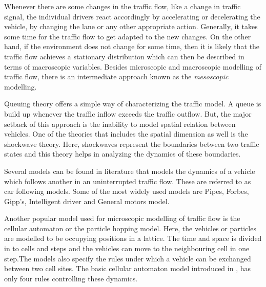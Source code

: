 \documentclass[a4paper,12pt]{scrartcl}
\begin{document}
Whenever there are some changes in the traffic flow, like a change in traffic signal, the individual drivers react accordingly by accelerating or decelerating the vehicle, by changing the lane or any other appropriate action. Generally, it takes some time for the traffic flow to get adapted to the new changes. On the other hand, if the environment does not change for some time, then it is likely that the traffic flow achieves a stationary distribution which can then be described in terms of macroscopic variables. Besides microscopic and macroscopic modelling of traffic flow, there is an intermediate approach known as the \emph{mesoscopic} modelling.


Queuing theory offers a simple way of characterizing the traffic model. 
A queue is build up whenever the traffic inflow exceeds the traffic outflow. 
But, the major setback of this approach is the inability to model spatial relation between vehicles. One of the theories that includes the spatial dimension as well is the shockwave theory.
Here, shockwaves represent the boundaries between two traffic states and this theory helps in analyzing the dynamics of these boundaries.

Several models can be found in literature that models the dynamics of a vehicle which follows another in an uninterrupted traffic flow. These are referred to as car following models\cite{chakroborty1999TRET}.
Some of the most widely used models are Pipes, Forbes, Gipp's, Intelligent driver and General motors model. 

Another popular model used for microscopic modelling of traffic flow is the cellular automaton or the particle hopping model\cite{chowdhury2000PR}. Here, the vehicles or particles are modelled to be occupying positions in a lattice. The time and space is divided in to cells and steps and the vehicles can move to the neighbouring cell in one step.The models also specify the rules under which a vehicle can be exchanged between two cell sites. The basic cellular automaton model introduced in \cite{nagel1992EDP}, has only four rules controlling these dynamics.
\end{document}
